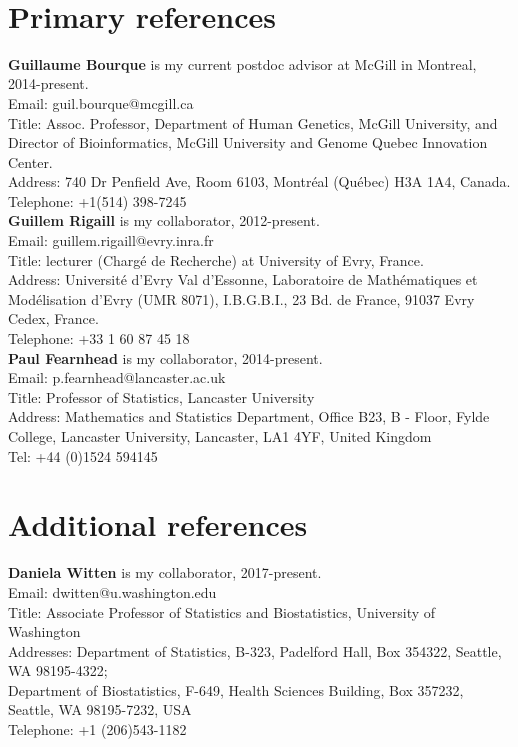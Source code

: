 \documentclass{article}
\begin{document}
\mbox{ }

\section*{Primary references}

{\bf Guillaume Bourque} is my current postdoc advisor at McGill in Montreal, 2014-present.\\
Email: guil.bourque@mcgill.ca\\
Title: Assoc. Professor, Department of Human Genetics, McGill University, and\\
Director of Bioinformatics, McGill University and Genome Quebec Innovation Center. \\
Address: 740 Dr Penfield Ave, Room 6103, Montréal (Québec) H3A 1A4, Canada.\\
Telephone: +1(514) 398-7245\\

{\bf Guillem Rigaill} is my collaborator, 2012-present.\\
Email: guillem.rigaill@evry.inra.fr\\
Title: lecturer (Charg\'e de Recherche) at University of Evry, France.\\
Address: Universit\'e d'Evry Val d'Essonne,
Laboratoire de Math\'ematiques et Mod\'elisation d'Evry (UMR 8071),
I.B.G.B.I., 23 Bd. de France, 91037 Evry Cedex,
France.\\
Telephone: +33 1 60 87 45 18\\

{\bf Paul Fearnhead} is my collaborator, 2014-present.\\
Email: p.fearnhead@lancaster.ac.uk\\
Title: Professor of Statistics, Lancaster University\\
Address: Mathematics and Statistics Department,
Office B23, B - Floor, Fylde College,
Lancaster University,
Lancaster, LA1 4YF,
United Kingdom\\
Tel: +44 (0)1524 594145\\

\section*{Additional references}

{\bf Daniela Witten} is my collaborator, 2017-present.\\
Email: dwitten@u.washington.edu\\
Title: Associate Professor of Statistics and Biostatistics, University of Washington\\
Addresses:
Department of Statistics,
B-323, Padelford Hall, Box 354322,
Seattle, WA 98195-4322;\\
Department of Biostatistics,
F-649, Health Sciences Building, Box 357232,
Seattle, WA 98195-7232,
USA\\
Telephone: +1 (206)543-1182\\
\end{document}
